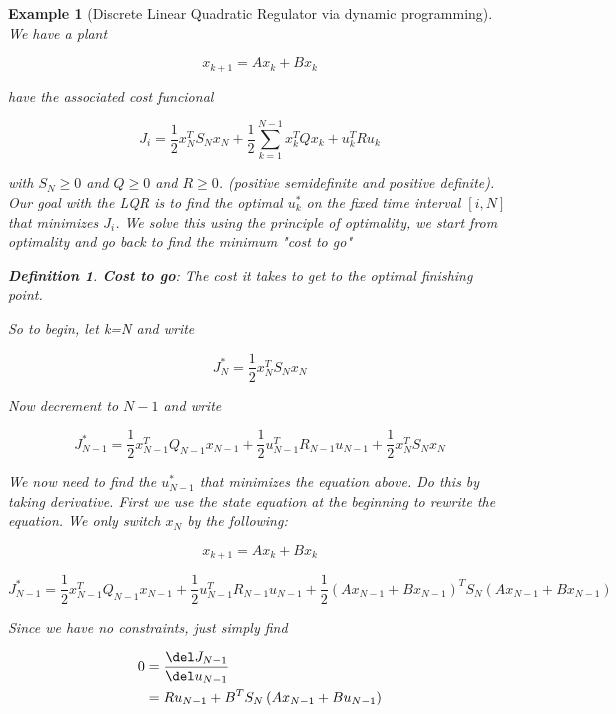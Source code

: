 \documentclass[11pt, a4paper]{article} %
\newtheorem{definition}[theorem]{Definition}
\newtheorem{example}[theorem]{Example}
\begin{document}
\begin{example}[Discrete Linear Quadratic Regulator via dynamic programming]
    We have a plant

    \[
        x_{k+1} = Ax_k + Bx_k
    \]

    have the associated cost funcional 

    \[
        J_i = \frac{ 1 }{ 2 } x_N^T S_N x_N + \frac{ 1 }{ 2 } \sum_{ k=1 }^{ N-1 } x_k^T Q x_k + u_k^T R u_k  
    \]

    with $ S_N \geq 0 $ and $ Q \geq 0 $  and $ R \ge 0 $. (positive semidefinite and positive definite). Our goal with the LQR is to find the optimal $ u_k^* $ on the fixed time interval $ \left[ i,N \right]  $ that minimizes $ J_i $. We solve this using the principle of optimality, we start from optimality and go back to find the minimum "cost to go"\\

    \begin{definition}
        \textbf{\textit{Cost to go}}: The cost it takes to get to the optimal finishing point.
    \end{definition}

    So to begin, let k=N and write

    \[
        J_N^* = \frac{ 1 }{ 2 } x_N^T S_N x_N
    \]

    Now decrement to $ N-1 $ and write 

    \[
        J_{N-1}^* = \frac{ 1 }{ 2 } x_{N-1}^T Q_{N-1} x_{N-1} + \frac{ 1 }{ 2 } u_{N-1}^T R_{N-1} u_{N-1} + \frac{ 1 }{ 2 } x_N^T S_N x_N
    \]

    We now need to find the $ u_{N-1}^* $ that minimizes the equation above. Do this by taking derivative. First we use the state equation at the beginning to rewrite the equation. We only switch $ x_N $ by the following:
    
    \[
       x_{k+1} = Ax_k + Bx_k 
    \]
    
    
    \[
        J_{N-1}^* = \frac{ 1 }{ 2 } x_{N-1}^T Q_{N-1} x_{N-1} + \frac{ 1 }{ 2 } u_{N-1}^T R_{N-1} u_{N-1} + \frac{ 1 }{ 2 } \left( Ax_{N-1} + Bx_{N-1} \right) ^T S_N \left( Ax_{N-1} + Bx_{N-1} \right)
    \]


    Since we have no constraints, just simply find 
        
        
    \begin{align*}
        0 &= \frac{ \del J_{N-1} }{ \del u_{N-1} } \\
        &= Ru_{N-1} + B^T S_N \left( Ax_{N-1} + Bu_{N-1} \right) 
    \end{align*}


\end{example}
\end{document}
